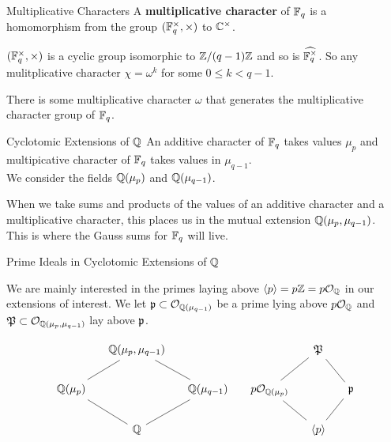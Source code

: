 \documentclass[presentation]{beamer}
\begin{document}
\begin{frame}{Multiplicative Characters}
A \textbf{multiplicative character} of $\mathbb{F}_q$ is a homomorphism from the group $(\mathbb{F}_q^\times, \times)$ to $\mathbb{C}^\times$. 
\\

\pause
\vspace{0.5cm}

$(\mathbb{F}_q^\times, \times)$ is a cyclic group isomorphic to $\mathbb{Z}/(q - 1)\mathbb{Z}$ and so is $\widehat{\mathbb{F}_q^\times}$. So any mulitplicative character $\chi = \omega^k$ for some $0 \leq k < q-1$.
\\

\pause
\vspace{0.5cm}

There is some multiplicative character $\omega$ that generates the multiplicative character group of $\mathbb{F}_q$.

\end{frame}

\begin{frame}{Cyclotomic Extensions of $\mathbb{Q}$}
An additive character of $\mathbb{F}_q$ takes values $\mu_p$ and multipicative character of $\mathbb{F}_q$ takes values in $\mu_{q-1}$.\\

We consider the fields $\mathbb{Q}(\mu_p)$ and $\mathbb{Q}(\mu_{q-1})$.
\\
\pause 
\vspace{0.5cm}

When we take sums and products of the values of an additive character and a multiplicative character, this places us in the mutual extension $\mathbb{Q}(\mu_p, \mu_{q-1})$. 
\\
\pause
\vspace{0.5cm}
This is where the Gauss sums for $\mathbb{F}_q$ will live.


\end{frame}

\begin{frame}{Prime Ideals in Cyclotomic Extensions of $\mathbb{Q}$}

We are mainly interested in the primes laying above $\langle p \rangle = p\mathbb{Z} = p \mathcal{O}_{\mathbb{Q}}$ in our extensions of interest. We let $\mathfrak{p} \subset \mathcal{O}_{\mathbb{Q}(\mu_{q-1})}$ be a prime lying above $p\mathcal{O}_{\mathbb{Q}}$ and $\mathfrak{P} \subset \mathcal{O}_{\mathbb{Q}(\mu_p, \mu_{q-1})}$ lay above $\mathfrak{p}$.
\pause

\[\begin{tikzcd}[ampersand replacement=\&, column sep=small]
	\& {\mathbb{Q}(\mu_p,\mu_{q-1})} \&\&\& {\mathfrak{P}} \\
	{\mathbb{Q}(\mu_p)} \&\& {\mathbb{Q}(\mu_{q-1})} \& {p\mathcal{O}_{\mathbb{Q}(\mu_p)}} \&\& {\mathfrak{p}} \\
	\& {\mathbb{Q}} \&\&\& {\langle p \rangle}
	\arrow[no head, from=3-2, to=2-3]
	\arrow[no head, from=3-2, to=2-1]
	\arrow[no head, from=2-3, to=1-2]
	\arrow[no head, from=2-1, to=1-2]
	\arrow[no head, from=3-5, to=2-6]
	\arrow[no head, from=2-6, to=1-5]
	\arrow[no head, from=3-5, to=2-4]
	\arrow[no head, from=2-4, to=1-5]
\end{tikzcd}\]

\end{frame}
\end{document}
